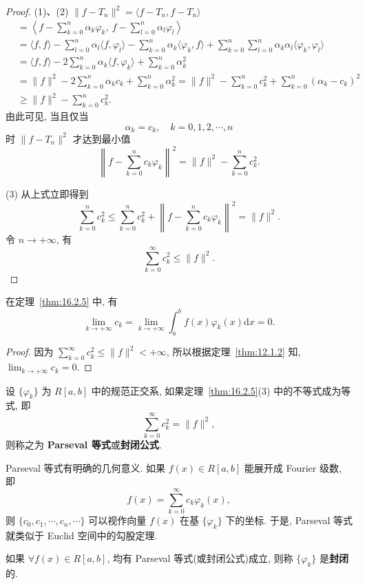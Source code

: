 \begin{proof}
(1)、(2) $\|f-T_{n}\|^{2}=\langle f-T_{n},f-T_{n}\rangle$
\[
  \begin{aligned}
    &=\left\langle f-\sum_{k=0}^{n}\alpha_{k}\varphi_{k},\ f-\sum_{l=0}^{n}\alpha_{l}\varphi_{l}\right\rangle\\
    &=\langle f,f\rangle-\sum_{l=0}^{n}\alpha_{l}\langle f,\varphi_{l}\rangle-\sum_{k=0}^{n}\alpha_{k}\langle\varphi_{k},f\rangle+\sum_{k=0}^{n}\sum_{l=0}^{n}\alpha_{k}\alpha_{l}\langle\varphi_{k},\varphi_{l}\rangle\\
    &=\langle f,f\rangle-2\sum_{k=0}^{n}\alpha_{k}\langle f,\varphi_{k}\rangle+\sum_{k=0}^{n}\alpha_{k}^{2}\\
    &=\| f\|^{2}-2\sum_{k=0}^{n}\alpha_{k}c_{k}+\sum_{k=0}^{n}\alpha_{k}^{2}=\| f\|^{2}-\sum_{k=0}^{n}c_{k}^{2}+\sum_{k=0}^{n}(\alpha_{k}-c_{k})^{2}\\
    &\geqslant\| f\|^{2}-\sum_{k=0}^{n}c_{k}^{2}.
  \end{aligned}
\]
由此可见, 当且仅当
\[
  \alpha_{k}=c_{k},\quad k=0,1,2,\cdots,n
\]
时 $\| f-T_{n}\|^{2}$ 才达到最小值
\[
  \left\|f-\sum_{k=0}^{n}c_{k}\varphi_{k}\right\|^{2}=\| f\|^{2}-\sum_{k=0}^{n}c_{k}^{2}.
\]

(3) 从上式立即得到
\[
  \sum_{k=0}^{n}c_{k}^{2}\leqslant\sum_{k=0}^{n}c_{k}^{2}+\left\|f-\sum_{k=0}^{n}c_{k}\varphi_{k}\right\|^{2}=\| f\|^{2}.
\]
令 $n \to +\infty$, 有
\[
  \sum_{k=0}^{\infty}c_{k}^{2}\leqslant\| f\|^{2}.
\]
\end{proof}

\begin{corollary}\label{cor:16.2.1}
在定理~\ref{thm:16.2.5} 中, 有
\[
  \lim_{k\to+\infty}c_{k}=\lim_{k\to+\infty}\int_{a}^{b}f(x)\varphi_{k}(x)\mathrm{d}x=0.
\]
\end{corollary}

\begin{proof}
因为 $\sum_{k=0}^{\infty} c_{k}^{2} \leqslant \|f\|^2 < +\infty$, 所以根据定理~\ref{thm:12.1.2} 知, $\lim_{k \to +\infty} c_{k} = 0$.
\end{proof}

\begin{definition}\label{def:16.2.4}
设 $\{\varphi_{k}\}$ 为 $R[a,b]$ 中的规范正交系, 如果定理~\ref{thm:16.2.5}(3) 中的不等式成为等式, 即
\[
  \sum_{k=0}^{\infty}c_{k}^{2}=\|f\|^{2},
\]
则称之为 \textbf{Parseval 等式}或\textbf{封闭公式}.

Parseval 等式有明确的几何意义. 如果 $f(x) \in R[a,b]$ 能展开成 Fourier 级数, 即
\[
  f(x)=\sum_{k=0}^{\infty}c_{k}\varphi_{k}(x),
\]
则 $\{c_{0},c_{1},\cdots,c_{n},\cdots\}$ 可以视作向量 $f(x)$ 在基 $\{\varphi_{k}\}$ 下的坐标. 于是, Parseval 等式就类似于 Euclid 空间中的勾股定理.

如果 $\forall f(x) \in R[a, b]$, 均有 Parseval 等式(或封闭公式)成立, 则称 $\{\varphi_k\}$ 是\textbf{封闭}的.
\end{definition}

